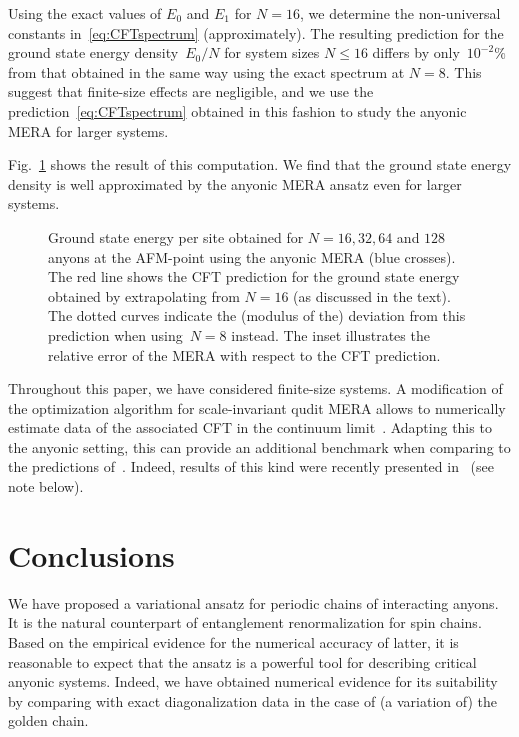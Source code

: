 \documentclass[floats,prb,twocolumn]{revtex4}
\newcommand*{\epersite}{\raisebox{-89.883pt}{\epsfig{file=epersite103.eps,clip=}}}
\begin{document}
Using  the exact values of $E_0$ and $E_1$ for $N=16$, we determine the non-universal constants in~\eqref{eq:CFTspectrum} (approximately). The resulting prediction for the ground state energy density~$E_0/N$ for system sizes $N\leq 16$ differs by only~$10^{-2}\%$ from that obtained in the same way using the exact spectrum at $N=8$. This suggest that finite-size effects are negligible, and we use the prediction~\eqref{eq:CFTspectrum} obtained in this fashion to study the anyonic MERA for larger systems.  

Fig.~\ref{fig:scalinglarge} shows the result of this computation. We find that the ground state energy density is well approximated by the anyonic MERA ansatz even for larger systems. 
\begin{figure}
\scalebox{0.9}{\epersite}
\caption{Ground state energy per site obtained for  $N=16,32,64$ and $128$ anyons at the AFM-point using the anyonic MERA (blue crosses). The red line shows the CFT prediction for the ground state  energy  obtained by extrapolating from $N=16$ (as discussed in the text). The dotted curves indicate the (modulus of the) deviation from this prediction when using~$N=8$ instead. The inset illustrates the relative error of the MERA with respect to the CFT prediction.
\label{fig:scalinglarge}}
\end{figure}

Throughout this paper, we have considered finite-size systems. A modification of the optimization algorithm for scale-invariant qudit MERA allows to numerically estimate data of the associated CFT in the continuum limit~\cite{Giovannettietal08,Pfeiferetal09,silvietal09}. Adapting this to the anyonic setting,
this can provide an additional benchmark when comparing to the predictions of~\cite{Feiguinetal07,trebstetalcollective08}. Indeed, results of this kind were recently presented in~\cite{Pfeiferetal10} (see note below). 
 




\section{Conclusions\label{sec:conclusions}}
We have proposed a variational ansatz for periodic chains of interacting anyons. It is the natural counterpart of entanglement renormalization for spin chains. Based on the empirical evidence for the numerical accuracy of latter, it is reasonable to expect that the ansatz is a powerful tool for describing critical anyonic systems. Indeed, we have obtained numerical evidence for its suitability   by comparing with exact diagonalization data in the case of (a variation of) the golden chain. 
\end{document}
